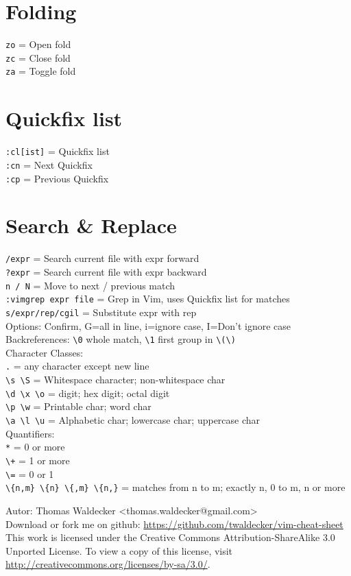\documentclass[10pt,DIV=50,landscape,pagesize,parskip=off]{scrartcl}
\newcommand\co[1]{\texttt{#1}}
\newcommand\coe[2]{\co{#1} = #2}
\begin{document}
\begin{multicols}{3}
\section{Folding}
\coe{zo}{Open fold}\\
\coe{zc}{Close fold}\\
\coe{za}{Toggle fold}

\section{Quickfix list}
\coe{:cl[ist]}{Quickfix list}\\
\coe{:cn}{Next Quickfix}\\
\coe{:cp}{Previous Quickfix}

\section{Search \& Replace}
\coe{/expr}{Search current file with expr forward}\\
\coe{?expr}{Search current file with expr backward}\\
\coe{n / N}{Move to next / previous match}\\
\coe{:vimgrep expr file}{Grep in Vim, uses Quickfix list for matches}\\
\coe{s/expr/rep/cgil}{Substitute expr with rep\\Options: Confirm, G=all in line, i=ignore case, I=Don't ignore case}\\
Backreferences: \lstinline|\0| whole match, \lstinline|\1| first group in \lstinline|\(\)|\\
Character Classes:\\
\coe{.}{any character except new line}\\
\lstinline|\s \S| = Whitespace character; non-whitespace char\\
\lstinline|\d \x \o| = digit; hex digit; octal digit\\
\lstinline|\p \w| = Printable char; word char\\
\lstinline|\a \l \u| = Alphabetic char; lowercase char; uppercase char\\
Quantifiers:\\
\lstinline|*| = 0 or more\\
\lstinline|\+| = 1 or more\\
\lstinline|\=| = 0 or 1\\
\lstinline|\{n,m} \{n} \{,m} \{n,}| = matches from n to m; exactly n, 0 to m, n or more

\begin{framed}
{\small Autor: Thomas Waldecker <thomas.waldecker@gmail.com>\\
Download or fork me on github: \url{https://github.com/twaldecker/vim-cheat-sheet}\\
This work is licensed under the
Creative Commons Attribution-ShareAlike 3.0 Unported License. To view a copy of
this license, visit \url{http://creativecommons.org/licenses/by-sa/3.0/}.}
\end{framed}

\end{multicols}
\end{document}
